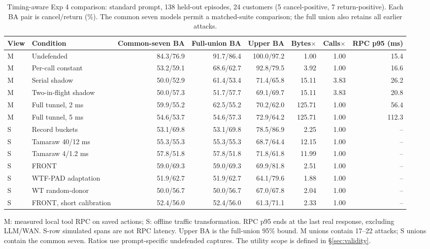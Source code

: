 \begin{table}[t]\centering\footnotesize
\caption{Timing-aware Exp 4 comparison: standard prompt, 138 held-out episodes, 24 customers (5 cancel-positive, 7 return-positive). Each BA pair is cancel/return (\%). The common seven models permit a matched-suite comparison; the full union also retains all earlier attacks. }\label{tab:r7-controls}
\begin{tabular}{@{}llrrrrrr@{}}\toprule
View & Condition & Common-seven BA & Full-union BA & Upper BA & Bytes$\times$ & Calls$\times$ & RPC p95 (ms)\\\midrule
M & Undefended & 84.3/76.9 & 91.7/86.4 & 100.0/97.2 & 1.00 & 1.00 & 15.4\\
M & Per-call constant & 53.2/59.1 & 68.6/62.7 & 92.8/79.5 & 3.92 & 1.00 & 16.6\\
M & Serial shadow & 50.0/52.9 & 61.4/53.4 & 71.4/65.8 & 15.11 & 3.83 & 26.2\\
M & Two-in-flight shadow & 50.0/57.3 & 51.7/57.7 & 69.1/69.7 & 15.11 & 3.83 & 20.8\\
M & Full tunnel, 2 ms & 59.9/55.2 & 62.5/55.2 & 70.2/62.0 & 125.71 & 1.00 & 56.4\\
M & Full tunnel, 5 ms & 54.6/53.7 & 54.6/57.3 & 72.9/64.2 & 125.71 & 1.00 & 112.3\\
S & Record buckets & 53.1/69.8 & 53.1/69.8 & 78.5/86.9 & 2.25 & 1.00 & --\\
S & Tamaraw 40/12 ms & 55.3/55.3 & 55.3/55.3 & 68.7/64.4 & 12.15 & 1.00 & --\\
S & Tamaraw 4/1.2 ms & 57.8/51.8 & 57.8/51.8 & 71.8/61.8 & 11.99 & 1.00 & --\\
S & FRONT & 59.0/69.3 & 59.0/69.3 & 69.9/81.8 & 2.51 & 1.00 & --\\
S & WTF-PAD adaptation & 51.9/62.7 & 51.9/62.7 & 64.1/79.6 & 1.88 & 1.00 & --\\
S & WT random-donor & 50.0/56.7 & 50.0/56.7 & 67.0/67.8 & 2.04 & 1.00 & --\\
S & FRONT, short calibration & 52.4/56.0 & 52.4/56.0 & 61.3/71.1 & 2.33 & 1.00 & --\\
\bottomrule\end{tabular}
\par\smallskip\raggedright M: measured local tool RPC on saved actions; S: offline traffic transformation. RPC p95 ends at the last real response, excluding LLM/WAN. S-row simulated spans are not RPC latency. Upper BA is the full-union 95\% bound. M unions contain 17--22 attacks; S unions contain the common seven. Ratios use prompt-specific undefended captures. The utility scope is defined in \S\ref{sec:validity}.
\end{table}
